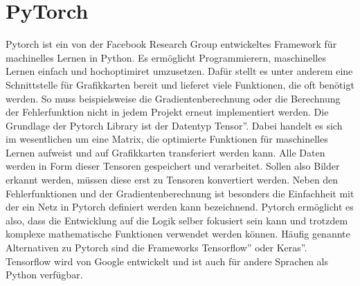 \documentclass[11pt]{article}
\begin{document}
\section{PyTorch}
Pytorch ist ein von der Facebook Research Group entwickeltes Framework für machinelles Lernen in Python. Es ermöglicht Programmierern, maschinelles Lernen einfach und hochoptimiret umzusetzen. Dafür stellt es unter anderem eine Schnittstelle für Grafikkarten bereit und lieferet viele Funktionen, die oft benötigt werden. So muss beispielsweise die Gradientenberechnung oder die Berechnung der Fehlerfunktion nicht in jedem Projekt erneut implementiert werden. Die Grundlage der Pytorch Library ist der Datentyp \glqq Tensor''. Dabei handelt es sich im wesentlichen um eine Matrix, die optimierte Funktionen für maschinelles Lernen aufweist und auf Grafikkarten transferiert werden kann. Alle Daten werden in Form dieser Tensoren gespeichert und verarbeitet. Sollen also Bilder erkannt werden, müssen diese erst zu Tensoren konvertiert werden. Neben den Fehlerfunktionen und der Gradientenberechnung ist besonders die Einfachheit mit der ein Netz in Pytorch definiert werden kann bezeichnend. Pytorch ermöglicht es also, dass die Entwicklung auf die Logik selber fokusiert sein kann und trotzdem komplexe mathematische Funktionen verwendet werden können. Häufig genannte Alternativen zu Pytorch sind die Frameworks \glqq Tensorflow'' oder \glqq Keras''. Tensorflow wird von Google entwickelt und ist auch für andere Sprachen als Python verfügbar.
\end{document}
